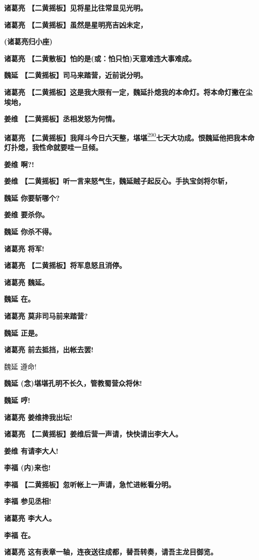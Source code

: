 \textbf{诸葛亮 【二黄摇板】见将星比往常显见光明。}

\textbf{诸葛亮 【二黄摇板】虽然是星明亮吉凶未定，}

\textbf{(诸葛亮归小座)}

\textbf{诸葛亮 【二黄散板】怕的是(或：怕只怕)天意难违大事难成。}

\textbf{魏延 【二黄摇板】司马来踏营，近前说分明。}

\textbf{诸葛亮
【二黄摇板】这是我大限有一定，魏延扑熄我的本命灯。将本命灯撇在尘埃地，}

\textbf{姜维 【二黄摇板】丞相发怒为何情。}

\textbf{诸葛亮
【二黄摇板】我拜斗今日六天整，堪堪}\protect\hyperlink{fn290}{\textsuperscript{290}}\textbf{七天大功成。恨魏延他把我本命灯扑熄，我性命就要哇一旦倾。}

\textbf{姜维 啊?!}

\textbf{姜维
【二黄摇板】听一言来怒气生，魏延贼子起反心。手执宝剑将尔斩，}

\textbf{魏延 你要斩哪个?}

\textbf{姜维 要杀你。}

\textbf{魏延 你杀不得。}

\textbf{诸葛亮 将军!}

\textbf{诸葛亮 【二黄摇板】将军息怒且消停。}

\textbf{诸葛亮 魏延。}

\textbf{魏延 在。}

\textbf{诸葛亮 莫非司马前来踏营?}

\textbf{魏延 正是。}

\textbf{诸葛亮 前去抵挡，出帐去罢!}

魏延 遵命!

\textbf{魏延 (念)堪堪孔明不长久，管教蜀营众将休!}

\textbf{魏延 哼!}

\textbf{诸葛亮 姜维搀我出坛!}

\textbf{诸葛亮 【二黄摇板】姜维后营一声请，快快请出李大人。}

\textbf{姜维 有请李大人!}

\textbf{李福 (内)来也!}

\textbf{李福 【二黄摇板】忽听帐上一声请，急忙进帐看分明。}

\textbf{李福 参见丞相!}

\textbf{诸葛亮 李大人。}

\textbf{李福 在。}

\textbf{诸葛亮 这有表章一轴，连夜送往成都，替吾转奏，请吾主龙目御览。}

